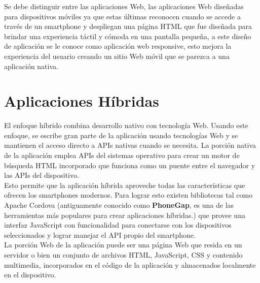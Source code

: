   Se debe distinguir entre las aplicaciones Web, las aplicaciones Web diseñadas para dispositivos móviles ya que estas últimas reconocen cuando se accede a través de un smartphone y despliegan una página HTML que fue diseñada para brindar una experiencia táctil y cómoda en una pantalla pequeña, a este diseño de aplicación se le conoce como aplicación web responsive, esto mejora la experiencia del usuario creando un sitio Web móvil que se parezca a una aplicación nativa.\\


  \section{Aplicaciones Híbridas}
  \label{sec:aplicaciones_hibridas}

    El enfoque híbrido combina desarrollo nativo con tecnología Web. Usando este enfoque, se escribe gran parte de la aplicación usando tecnologías Web y se mantienen el acceso directo a APIs nativas cuando se necesita. La porción nativa de la aplicación emplea APIs del sistemas operativo para crear un motor de búsqueda HTML incorporado que funciona como un puente entre el navegador y las APIs del dispositivo\cite{IBM_Mobile}.\\

    Esto permite que la aplicación híbrida aproveche todas las características que ofrecen los smartphones modernos. Para lograr esto existen bibliotecas tal como Apache Cordova (antiguamente conocido como \textbf{PhoneGap}, es una de las herramientas más populares para crear aplicaciones híbridas.) que provee una interfaz JavaScript con funcionalidad para conectarse con los dispositivos seleccionados y lograr manejar el API propio del smartphone.\\

    La porción Web de la aplicación puede ser una página Web que resida en un servidor o bien un conjunto de archivos HTML, JavaScript, CSS y contenido multimedia, incorporados en el código de la aplicación y almacenados localmente en el dispositivo\cite{IBM_Mobile}.\\



